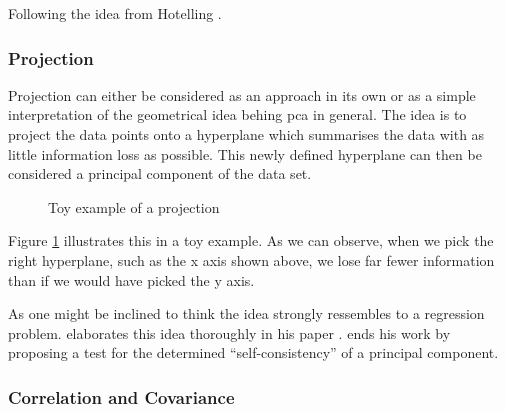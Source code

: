 Following the idea from Hotelling \cite{deisenroth2020mathematics, hotelling1933analysis}.

\subsubsection{Projection}



Projection can either be considered as an approach in its own or as a simple interpretation of the geometrical idea behing \gls{pca} in general.
The idea is to project the data points onto a \gls{hyperplane} which summarises the data with as little information loss as possible.
This newly defined hyperplane can then be considered a principal component of the data set.


\renewcommand{\tikzscale}{0.4}
\begin{figure}[h]
	\centering
	
	\captionsetup{justification=centering}
	\vspace*{4mm}
	\caption{Toy example of a projection}
    \label{fig:projectionExample}
\end{figure}


Figure \ref{fig:projectionExample} illustrates this in a toy example.
As we can observe, when we pick the right \gls{hyperplane}, such as the x axis shown above, we lose far fewer information than if we would have picked the y axis.\bigskip


As one might be inclined to think the idea strongly ressembles to a regression problem. 
\citeauthor{tarpey1999self} elaborates this idea thoroughly in his paper  \cite{tarpey1999self}.
\citeauthor{tarpey1999self} ends his work by proposing a test for the determined ``self-consistency'' of a principal component.






\clearpage



\subsubsection{Correlation and Covariance} \label{section:correlationANDcovariance}

